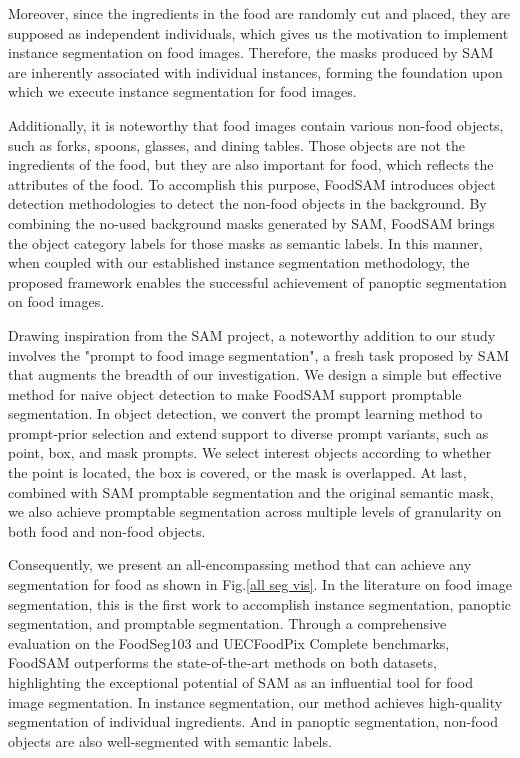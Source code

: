 \documentclass[lettersize,journal]{IEEEtran}
\begin{document}
Moreover, since the ingredients in the food are randomly cut and placed, they are supposed as independent individuals, which gives us the motivation to implement instance segmentation on food images. 
Therefore, the masks produced by SAM are inherently associated with individual instances, forming the foundation upon which we execute instance segmentation for food images.

Additionally, it is noteworthy that food images contain various non-food objects, such as forks, spoons, glasses, and dining tables.
Those objects are not the ingredients of the food, but they are also important for food, which reflects the attributes of the food.
To accomplish this purpose, FoodSAM introduces object detection methodologies \cite{padilla2020survey, zou2023object,zhou2022simple} to detect the non-food objects in the background.
By combining the no-used background masks generated by SAM, FoodSAM brings the object category labels for those masks as semantic labels.
In this manner, when coupled with our established instance segmentation methodology, the proposed framework enables the successful achievement of panoptic segmentation on food images.

Drawing inspiration from the SAM project, a noteworthy addition to our study involves the "prompt to food image segmentation", a fresh task proposed by SAM that augments the breadth of our investigation.
We design a simple but effective method for naive object detection to make FoodSAM support promptable segmentation.
In object detection, we convert the prompt learning method to prompt-prior selection and extend support to diverse prompt variants, such as point, box, and mask prompts.
We select interest objects according to whether the point is located, the box is covered, or the mask is overlapped.
At last, combined with SAM promptable segmentation and the original semantic mask, we also achieve promptable segmentation across multiple levels of granularity on both food and non-food objects.



Consequently, we present an all-encompassing method that can achieve any segmentation for food as shown in Fig.\ref{all seg vis}. 
In the literature on food image segmentation, this is the first work to accomplish instance segmentation, panoptic segmentation, and promptable segmentation.
Through a comprehensive evaluation on the FoodSeg103 \cite{wu2021large} and UECFoodPix Complete \cite{okamoto2021uec} benchmarks, 
FoodSAM outperforms the state-of-the-art methods on both datasets, highlighting the exceptional potential of SAM as an influential tool for food image segmentation.
In instance segmentation, our method achieves high-quality segmentation of individual ingredients. 
And in panoptic segmentation, non-food objects are also well-segmented with semantic labels.
\end{document}

